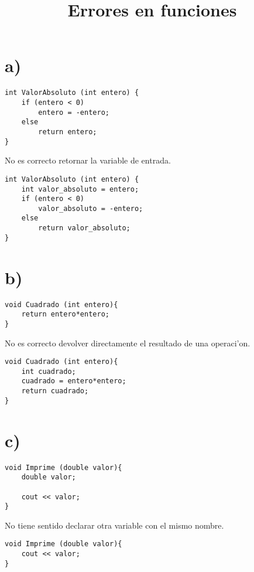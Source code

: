 \documentclass[12pt]{article}
\title{Errores en funciones}
\date{}
\begin{document}
\maketitle

\section*{a)}

\lstset{language=C++, breaklines=true, basicstyle=\footnotesize}
\begin{lstlisting}
int ValorAbsoluto (int entero) {
	if (entero < 0)
		entero = -entero;
	else
		return entero;
}
\end{lstlisting}

No es correcto retornar la variable de entrada.

\begin{lstlisting}
int ValorAbsoluto (int entero) {
	int valor_absoluto = entero;
	if (entero < 0)
		valor_absoluto = -entero;
	else
		return valor_absoluto;
}
\end{lstlisting}

\section*{b)}

\begin{lstlisting}
void Cuadrado (int entero){
	return entero*entero;
}
\end{lstlisting}

No es correcto devolver directamente el resultado de
una operaci'on.

\begin{lstlisting}
void Cuadrado (int entero){
	int cuadrado;
	cuadrado = entero*entero;
	return cuadrado;
}
\end{lstlisting}

\section*{c)}

\begin{lstlisting}
void Imprime (double valor){
	double valor;
	
	cout << valor;
}
\end{lstlisting}

No tiene sentido declarar otra variable con el mismo nombre.

\begin{lstlisting}
void Imprime (double valor){
	cout << valor;
}
\end{lstlisting}
\end{document}

